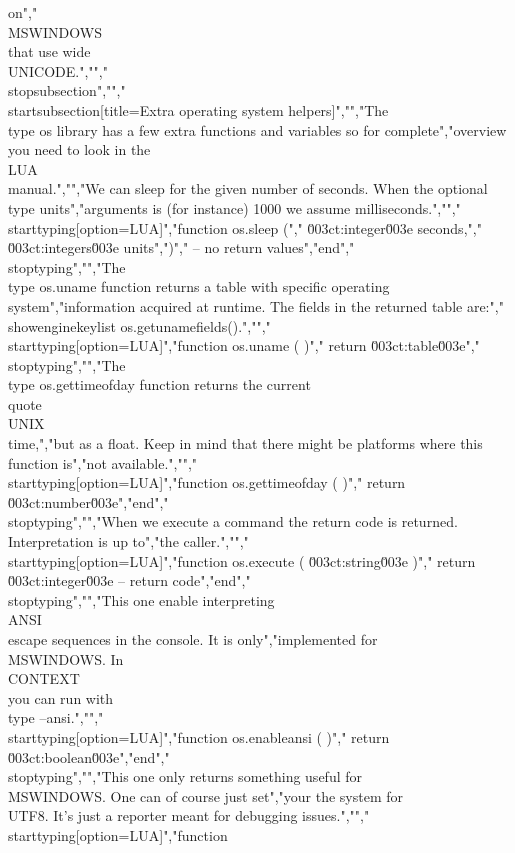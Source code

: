 on","\\MSWINDOWS\\ that use wide \\UNICODE.","","\\stopsubsection","","\\startsubsection[title=Extra operating system helpers]","","The \\type {os} library has a few extra functions and variables so for complete","overview you need to look in the \\LUA\\ manual.","","We can sleep for the given number of seconds. When the optional \\type {units}","arguments is (for instance) 1000 we assume milliseconds.","","\\starttyping[option=LUA]","function os.sleep (","    \u003ct:integer\u003e  seconds,","    \u003ct:integers\u003e units",")","    -- no return values","end","\\stoptyping","","The \\type {os.uname} function returns a table with specific operating system","information acquired at runtime. The fields in the returned table are:","\\showenginekeylist {os.getunamefields()}.","","\\starttyping[option=LUA]","function os.uname ( )","    return \u003ct:table\u003e","\\stoptyping","","The \\type {os.gettimeofday} function returns the current \\quote {\\UNIX\\ time},","but as a float. Keep in mind that there might be platforms where this function is","not available.","","\\starttyping[option=LUA]","function os.gettimeofday ( )","    return \u003ct:number\u003e","end","\\stoptyping","","When we execute a command the return code is returned. Interpretation is up to","the caller.","","\\starttyping[option=LUA]","function os.execute ( \u003ct:string\u003e )","    return \u003ct:integer\u003e -- return code","end","\\stoptyping","","This one enable interpreting \\ANSI\\ escape sequences in the console. It is only","implemented for \\MSWINDOWS. In \\CONTEXT\\ you can run with \\type {--ansi}.","","\\starttyping[option=LUA]","function os.enableansi ( )","    return \u003ct:boolean\u003e","end","\\stoptyping","","This one only returns something useful for \\MSWINDOWS. One can of course just set","your the system for \\UTF8. It's just a reporter meant for debugging issues.","","\\starttyping[option=LUA]","function 